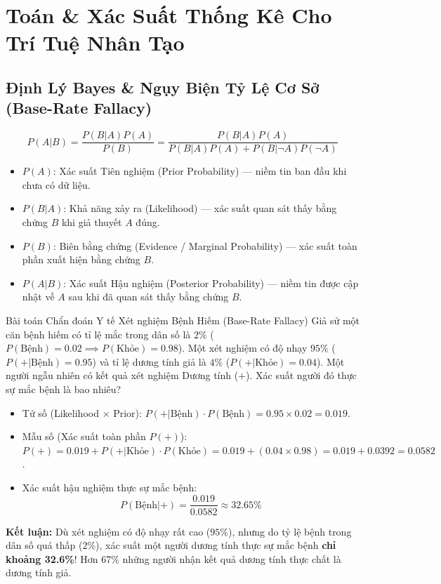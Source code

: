 \documentclass[10pt,a4paper]{article}
\begin{document}
\section{Toán \& Xác Suất Thống Kê Cho Trí Tuệ Nhân Tạo}

\subsection{Định Lý Bayes \& Ngụy Biện Tỷ Lệ Cơ Sở (Base-Rate Fallacy)}
\begin{equation}
    P(A | B) = \frac{P(B | A) P(A)}{P(B)} = \frac{P(B | A) P(A)}{P(B | A)P(A) + P(B | \neg A)P(\neg A)}
\end{equation}
\begin{itemize}[leftmargin=*]
    \item $P(A)$: Xác suất Tiên nghiệm (Prior Probability) --- niềm tin ban đầu khi chưa có dữ liệu.
    \item $P(B | A)$: Khả năng xảy ra (Likelihood) --- xác suất quan sát thấy bằng chứng $B$ khi giả thuyết $A$ đúng.
    \item $P(B)$: Biên bằng chứng (Evidence / Marginal Probability) --- xác suất toàn phần xuất hiện bằng chứng $B$.
    \item $P(A | B)$: Xác suất Hậu nghiệm (Posterior Probability) --- niềm tin được cập nhật về $A$ sau khi đã quan sát thấy bằng chứng $B$.
\end{itemize}

\begin{examplebox}{Bài toán Chẩn đoán Y tế Xét nghiệm Bệnh Hiếm (Base-Rate Fallacy)}
Giả sử một căn bệnh hiếm có tỉ lệ mắc trong dân số là $2\%$ ($P(\text{Bệnh}) = 0.02 \implies P(\text{Khỏe}) = 0.98$). Một xét nghiệm có độ nhạy $95\%$ ($P(+ | \text{Bệnh}) = 0.95$) và tỉ lệ dương tính giả là $4\%$ ($P(+ | \text{Khỏe}) = 0.04$). Một người ngẫu nhiên có kết quả xét nghiệm Dương tính ($+$). Xác suất người đó thực sự mắc bệnh là bao nhiêu?
\begin{itemize}[leftmargin=*]
    \item Tử số (Likelihood $\times$ Prior): $P(+ | \text{Bệnh}) \cdot P(\text{Bệnh}) = 0.95 \times 0.02 = 0.019$.
    \item Mẫu số (Xác suất toàn phần $P(+)$):
    $P(+) = 0.019 + P(+ | \text{Khỏe}) \cdot P(\text{Khỏe}) = 0.019 + (0.04 \times 0.98) = 0.019 + 0.0392 = 0.0582$.
    \item Xác suất hậu nghiệm thực sự mắc bệnh:
    \begin{equation*}
        P(\text{Bệnh} | +) = \frac{0.019}{0.0582} \approx 32.65\%
    \end{equation*}
\end{itemize}
\textbf{Kết luận:} Dù xét nghiệm có độ nhạy rất cao ($95\%$), nhưng do tỷ lệ bệnh trong dân số quá thấp ($2\%$), xác suất một người dương tính thực sự mắc bệnh \textbf{chỉ khoảng 32.6\%}! Hơn 67\% những người nhận kết quả dương tính thực chất là dương tính giả.
\end{examplebox}
\end{document}
